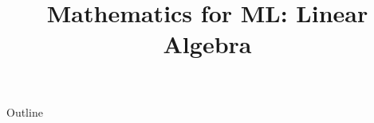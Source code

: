 \documentclass[xcolor=dvipsnames,compress,t,pdf,9pt]{beamer}
\title[\insertframenumber /\inserttotalframenumber]{Mathematics for ML: Linear Algebra}
\begin{document}
	\begin{frame}
	\titlepage
	\end{frame}

	\begin{frame}{Outline}
	    \tableofcontents
	\end{frame}

	
	
	
	
\end{document}
